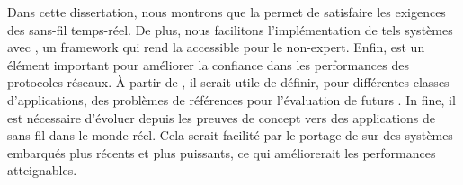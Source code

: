 \startsquarepar
Dans cette dissertation, nous montrons que la \ST permet de satisfaire les exigences des \CPS sans-fil temps-réel.
De plus, nous facilitons l'implémentation de tels systèmes avec \baloo, un framework qui rend la \ST accessible pour le non-expert.
Enfin, \triscale est un élément important pour améliorer la confiance dans les performances des protocoles réseaux.
À partir de \triscale, il serait utile de définir, pour différentes classes d'applications, des problèmes de références pour l'évaluation de futurs \CPS.
In fine, il est nécessaire d'évoluer depuis les preuves de concept vers des applications de \CPS sans-fil dans le monde réel. Cela serait facilité par le portage de \baloo sur des systèmes embarqués plus récents et plus puissants, ce qui améliorerait les performances atteignables.
\stopsquarepar
